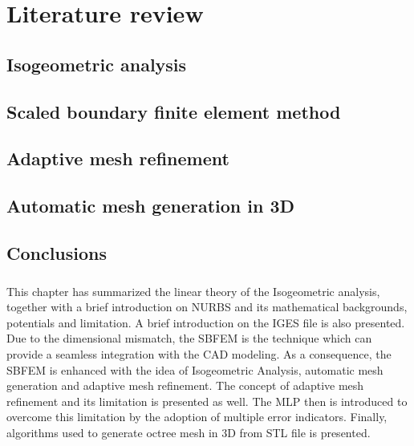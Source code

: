 
\chapter{Literature review}
% 

\section{Isogeometric analysis}
\label{lr_sec:iso_analysis}




\section{Scaled boundary finite element method}
\label{lr_sec:sbfem}


\section{Adaptive mesh refinement}



\section{Automatic mesh generation in 3D}


\section{Conclusions}
\paragraph{}
This chapter has summarized the linear theory of the Isogeometric analysis, together with a brief introduction on NURBS and its mathematical backgrounds, potentials and limitation.
A brief introduction on the IGES file is also presented.
Due to the dimensional mismatch, the SBFEM is the technique which can provide a seamless integration with the CAD modeling.
As a consequence, the SBFEM is enhanced with the idea of Isogeometric Analysis, automatic mesh generation and adaptive mesh refinement.
The concept of adaptive mesh refinement and its limitation is presented as well.
The MLP then is introduced to overcome this limitation by the adoption of multiple error indicators.
Finally, algorithms used to generate octree mesh in 3D from STL file is presented.
